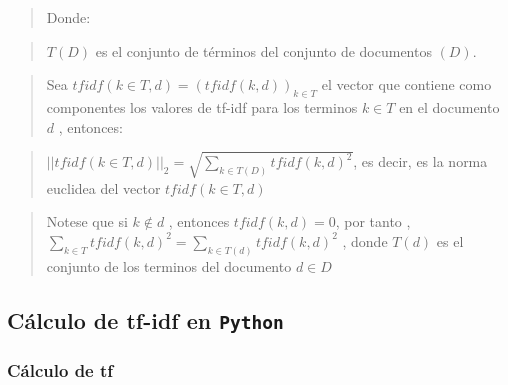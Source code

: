 \documentclass[
  11pt,
  a4paper,
]{article}
\begin{document}
\begin{quote}
Donde:
\end{quote}

\begin{quote}
\(T(D)\) es el conjunto de términos del conjunto de documentos \((D)\).
\end{quote}

\begin{quote}
Sea \(tfidf(k\in T, d) = ( tfidf(k, d) )_{k\in T}\) el vector que
contiene como componentes los valores de tf-idf para los terminos
\(k\in T\) en el documento \(d\) , entonces:
\end{quote}

\begin{quote}
\(|| tfidf(k\in T, d) ||_2 = \sqrt{ \sum_{k\in T(D)} tfidf(k, d)^2 }\),
es decir, es la norma euclidea del vector \(tfidf(k\in T, d)\)
\end{quote}

\begin{quote}
Notese que si \(k\notin d\) , entonces \(tfidf(k, d) = 0\), por tanto ,
\(\sum_{k\in T} tfidf(k, d)^2 = \sum_{k\in T(d)} tfidf(k, d)^2\) , donde
\(T(d)\) es el conjunto de los terminos del documento \(d \in D\)
\end{quote}

\hypertarget{cuxe1lculo-de-tf-idf-en-python}{%
\subsection{\texorpdfstring{Cálculo de tf-idf en
\texttt{Python}}{Cálculo de tf-idf en Python}}\label{cuxe1lculo-de-tf-idf-en-python}}

\hypertarget{cuxe1lculo-de-tf}{%
\subsubsection{Cálculo de tf}\label{cuxe1lculo-de-tf}}
\end{document}
